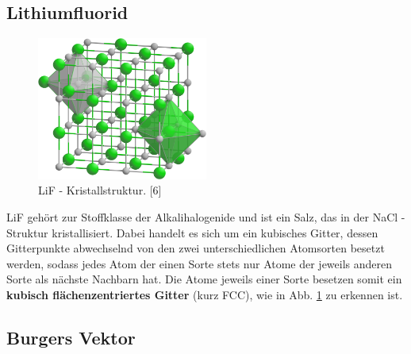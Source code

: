     \subsection{Lithiumfluorid}
	\begin{figure}[H]
            \centering
            \includegraphics[width=0.5\textwidth]{Images/LiF.PNG}
            \caption{LiF - Kristallstruktur. [6]}
            \label{FigLiF}
        \end{figure}
	LiF gehört zur Stoffklasse der Alkalihalogenide und ist ein Salz, das in der NaCl - Struktur kristallisiert. Dabei handelt es sich um ein kubisches Gitter, dessen Gitterpunkte
	abwechselnd von den zwei unterschiedlichen Atomsorten besetzt werden, sodass jedes Atom der einen Sorte stets nur Atome der jeweils anderen Sorte als nächste Nachbarn hat.
	Die Atome jeweils einer Sorte besetzen somit ein \textbf{kubisch flächenzentriertes Gitter} (kurz FCC), wie in Abb. \ref{FigLiF} zu erkennen ist. 


    \subsection{Burgers Vektor}

